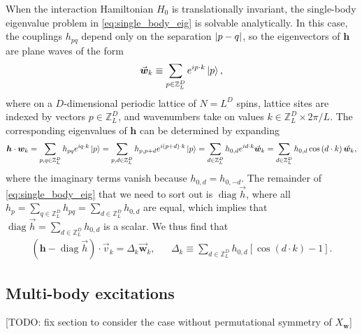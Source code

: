 \documentclass[nofootinbib,notitlepage,11pt]{revtex4-2}
\newcommand{\p}[1]{\left(#1\right)} %
\renewcommand{\sp}[1]{\left[#1\right]} %
\renewcommand{\c}{\cdot} %
\newcommand{\m}{\bm} %
\renewcommand{\v}{\vec} %
\newcommand{\1}{\mathds{1}}
\newcommand{\ZZ}{\mathbb{Z}}
\DeclareMathOperator{\diag}{diag}
\newcommand{\red}[1]{{\color{red} #1}}
\begin{document}
When the interaction Hamiltonian $H_0$ is translationally invariant,
the single-body eigenvalue problem in \eqref{eq:single_body_eig} is
solvable analytically.  In this case, the couplings $h_{pq}$ depend
only on the separation $\abs{p-q}$, so the eigenvectors of $\m h$ are
plane waves of the form
\begin{align}
  \v{\m w}_k \equiv \sum_{p\in\ZZ_L^D} e^{ip\c k} \ket{p},
\end{align}
where on a $D$-dimensional periodic lattice of $N=L^D$ spins, lattice
sites are indexed by vectors $p\in\ZZ_L^D$, and wavenumbers take on
values $k\in\ZZ_L^D\times2\pi/L$.  The corresponding eigenvalues of
$\m h$ can be determined by expanding
\begin{align}
  \m h\c{\m w}_k
  = \sum_{p,q\in\ZZ_L^D} h_{pq} e^{iq\c k} \ket{p}
  = \sum_{p,d\in\ZZ_L^D} h_{p,p+d} e^{i\p{p+d}\c k} \ket{p}
  = \sum_{d\in\ZZ_L^D} h_{0,d} e^{id\c k} \v{\m w}_k
  = \sum_{d\in\ZZ_L^D} h_{0,d} \cos\p{d\c k} \v{\m w}_k,
\end{align}
where the imaginary terms vanish because $h_{0,d}=h_{0,-d}$.  The
remainder of \eqref{eq:single_body_eig} that we need to sort out is
$\diag\v h$, where all
$h_p=\sum_{q\in\ZZ_L^D}h_{pq}=\sum_{d\in\ZZ_L^D}h_{0,d}$ are equal,
which implies that $\diag\v h=\sum_{d\in\ZZ_L^D}h_{0,d}$ is a scalar.
We thus find that
\begin{align}
  \p{\m h - \diag\v h}\c\v v_k = \Delta_k \v{\m w}_k,
  &&
  \Delta_k \equiv \sum_{d\in\ZZ_L^D} h_{0,d} \sp{\cos\p{d\c k}-1}.
\end{align}

\subsection{Multi-body excitations}
\label{sec:multi_body_eigenstates}

\red{[TODO: fix section to consider the case without permutational
  symmetry of $X_{\m w}$]}
\end{document}
